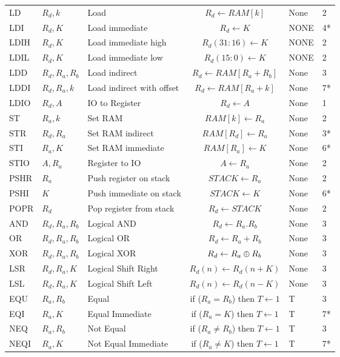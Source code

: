 \documentclass[12pt,twoside]{report}
\begin{document}
{\begin{longtable}{ | l | l | l | c | l | l | }
LD & $R_d, k$ & Load & $R_d \leftarrow RAM[k]$ & None & 2 \\
LDI & $R_d, K$ & Load immediate & $R_d \leftarrow K$ & NONE & 4* \\
LDIH & $R_d, K$ & Load immediate high & $R_d(31:16) \leftarrow K$ & NONE & 2 \\
LDIL & $R_d, K$ & Load immediate low & $R_d(15:0) \leftarrow K$ & NONE & 2 \\
LDD & $R_d, R_a, R_b$ & Load indirect & $R_d \leftarrow RAM[R_a + R_b]$ & None & 3 \\
LDDI & $R_d, R_a, k$ & Load indirect with offset & $R_d \leftarrow RAM[R_a + k]$ & None & 7* \\
LDIO & $R_d, A$ & IO to Register & $R_d \leftarrow A$ & None & 1 \\
ST & $R_a, k$ & Set RAM & $RAM[k] \leftarrow R_a$ & None & 2 \\
STR & $R_d, R_a$ & Set RAM indirect & $RAM[R_d] \leftarrow R_a$ & None & 3* \\
STI & $R_a, K$ & Set RAM immediate & $RAM[R_a] \leftarrow K$ & None & 6* \\
STIO & $A, R_a$ & Register to IO & $A \leftarrow R_a$ & None & 2 \\
PSHR & $R_a$ & Push register on stack & $STACK \leftarrow R_a$ & None & 2 \\
PSHI & $K$ & Push immediate on stack & $STACK \leftarrow K$ & None & 6* \\
POPR & $R_d$ & Pop register from stack & $R_d \leftarrow STACK$ & None & 2 \\
AND & $R_d, R_a, R_b$ & Logical AND & $R_d \leftarrow R_a . R_b $ & None & 3 \\
OR & $R_d, R_a, R_b$ & Logical OR & $R_d \leftarrow R_a + R_b $ & None & 3 \\
XOR & $R_d, R_a, R_b$ & Logical XOR & $R_d \leftarrow R_a \mathbin{\oplus} R_b $ & None & 3 \\
LSR & $R_d, R_a, K$ & Logical Shift Right & $R_d(n) \leftarrow R_d(n + K) $ & None & 3 \\
LSL & $R_d, R_a, K$ & Logical Shift Left & $R_d(n) \leftarrow R_d(n - K) $ & None & 3 \\
EQU & $R_a, R_b$ & Equal & if ($R_a = R_b$) then $T \leftarrow 1$ & T & 3 \\
EQI & $R_a, K$ & Equal Immediate & if ($R_a = K$) then $T \leftarrow 1$ & T & 7* \\
NEQ & $R_a, R_b$ & Not Equal & if ($R_a \neq R_b$) then $T \leftarrow 1$ & T & 3 \\
NEQI & $R_a, K$ & Not Equal Immediate & if ($R_a \neq K$) then $T \leftarrow 1$ & T & 7* \\

\end{longtable}}
\end{document}
